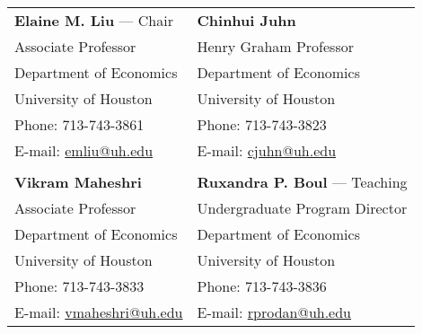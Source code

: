 \documentclass[10pt]{article}
\renewcommand{\section}[1]{\pagebreak[3]%
    \hyphenpenalty=10000%
    \vspace{1.3\baselineskip}%
    \phantomsection\addcontentsline{toc}{section}{#1}%
    \noindent\llap{\scshape\smash{\parbox[t]{\marginparwidth}{\raggedright #1}}}%
    \vspace{-\baselineskip}\par}
\newenvironment{innerlist}[1][\enskip\textbullet]%
        {\begin{itemize}[#1,leftmargin=*,parsep=0pt,itemsep=0pt,topsep=0pt,partopsep=0pt]}
        {\end{itemize}}
\newcommand{\halfblankline}{\quad\vspace{-0.5\baselineskip}\pagebreak[3]}
\providecommand*\email[1]{\href{mailto:#1}{#1}}
\providecommand\Matlab{\textsc{Matlab}}
\begin{document}
\noindent\begin{tabular}{@{}ll}
		\textbf{Elaine M. Liu} --- Chair           & \textbf{Chinhui Juhn}                    \\
		Associate Professor     & Henry Graham Professor          \\
		Department of Economics & Department of Economics         \\
		University of Houston   & University of Houston           \\
		Phone: 713-743-3861     & Phone: 713-743-3823             \\
		E-mail: \email{emliu@uh.edu}    & E-mail: \email{cjuhn@uh.edu}   \\
		&\\
		\textbf{Vikram Maheshri}         & \textbf{Ruxandra P. Boul} --- Teaching \\
		Associate Professor     & Undergraduate Program Director  \\
		Department of Economics & Department of Economics         \\
		University of Houston   & University of Houston           \\
		Phone: 713-743-3833     & Phone: 713-743-3836             \\
		E-mail: \email{vmaheshri@uh.edu} & E-mail: \email{rprodan@uh.edu}
	\end{tabular}




\begin{comment}
Computer Programming:
%
\begin{innerlist}
    \item C, C$+$$+$, Java, JavaScript, NetLogo, Pascal, Perl, PHP,
        Lisp, UNIX shell scripting (including POSIX.2), GNU make,
        AppleScript, SQL, MySQL, \Matlab, Maple, Mathematica, and others
\end{innerlist}

\halfblankline
\end{comment}
\end{document}

